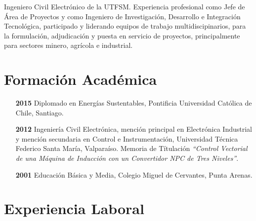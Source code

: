 \documentclass[a4paper]{article}
\begin{document}
Ingeniero Civil Electrónico de la UTFSM. %
Experiencia profesional como Jefe de Área de Proyectos y como Ingeniero de Investigación, 
Desarrollo e Integración Tecnológica, participado y liderando equipos de trabajo multidiscipinarios, 
para la formulación, adjudicación y puesta en servicio de proyectos, principalmente para sectores 
minero, agrícola e industrial.



\section*{Formación Académica}
\begin{itemize}
    \item[\textbf{2015}] {Diplomado en Energías Sustentables, Pontificia Universidad Católica de Chile, Santiago.}
    \item[\textbf{2012}]{Ingeniería Civil Electrónica, mención principal en Electrónica Industrial y mención secundaria en 
    Control e Instrumentación, Universidad Técnica Federico Santa María, Valparaíso. 
    Memoria de Títulación \textit{``Control Vectorial de una Máquina de Inducción con un Convertidor NPC de Tres Niveles''}.}
    \item[\textbf{2001}]{Educación Básica y Media, Colegio Miguel de Cervantes, Punta Arenas.}
    
\end{itemize}

\section*{Experiencia Laboral}
\end{document}
